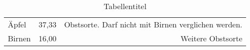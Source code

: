 \documentclass{article}
\begin{document}
  \begin{table}
    \caption{Tabellentitel}

    \begin{tabular}{|llr|}
        \hline
        Äpfel & 37,33 & Obstsorte. Darf nicht mit Birnen verglichen werden.\\
        Birnen & 16,00 & Weitere Obstsorte\\
        \hline
    \end{tabular}
  \end{table}
\end{document}
